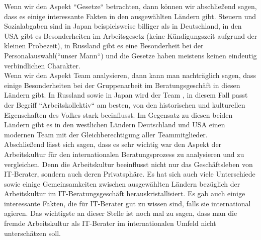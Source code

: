 Wenn wir den Aspekt ``Gesetze`` betrachten, dann können wir abschließend sagen, dass es einige interessante Fakten in den ausgewählten Ländern gibt. Steuern und Sozialabgaben sind in Japan beispielsweise billiger als in Deutschland, in den USA gibt es Besonderheiten im Arbeitsgesetz (keine Kündigungszeit aufgrund der kleinen Probezeit), in Russland gibt es eine Besonderheit bei der Personalauswahl(``unser Mann``) und die Gesetze haben meistens keinen eindeutig verbindlichen Charakter.\\
Wenn wir den Aspekt Team analysieren, dann kann man nachträglich sagen, dass einige Besonderheiten bei der Gruppenarbeit im Beratungsgeschäft in diesen Ländern gibt. In Russland sowie in Japan wird der Team , in diesem Fall passt der Begriff ``Arbeitskollektiv`` am besten, von den historischen und kulturellen Eigenschaften des Volkes stark beeinflusst. Im Gegensatz zu diesen beiden Ländern gibt es in den westlichen Ländern Deutschland und USA einen modernen Team mit der Gleichberechtigung aller Teammitglieder.\\
Abschließend lässt sich sagen, dass es sehr wichtig war den Aspekt der Arbeitskultur für den internationalen Beratungsprozess zu analysieren und zu vergleichen. Denn die Arbeitskultur beeinflusst nicht nur das Geschäftsleben von IT-Berater, sondern auch deren Privatsphäre. Es hat sich auch viele Unterschiede sowie einige Gemeinsamkeiten zwischen ausgewählten Ländern bezüglich der Arbeitskultur im IT-Beratungsgeschäft herauskristallisiert. Es gab auch einige interessante Fakten, die für IT-Berater gut zu wissen sind, falls sie international agieren. Das wichtigste an dieser Stelle ist noch mal zu sagen, dass man die fremde Arbeitskultur als IT-Berater im internationalen Umfeld nicht unterschätzen soll.






